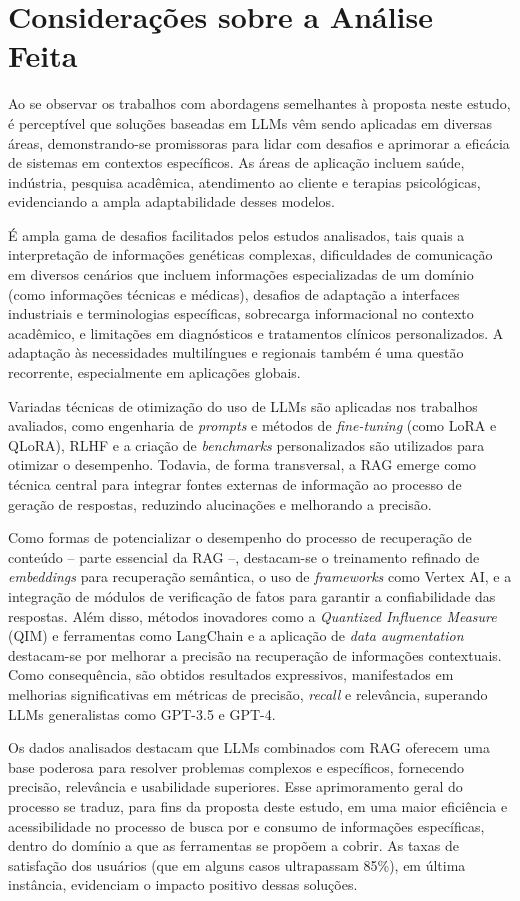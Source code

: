 \section{Considerações sobre a Análise Feita}
\label{sec:Literatura.2}

Ao se observar os trabalhos com abordagens semelhantes à proposta neste estudo, é perceptível que soluções baseadas em \ac{LLM}s vêm sendo aplicadas em diversas áreas, demonstrando-se promissoras para lidar com desafios e aprimorar a eficácia de sistemas em contextos específicos. As áreas de aplicação incluem saúde, indústria, pesquisa acadêmica, atendimento ao cliente e terapias psicológicas, evidenciando a ampla adaptabilidade desses modelos.

É ampla gama de desafios facilitados pelos estudos analisados, tais quais a interpretação de informações genéticas complexas, dificuldades de comunicação em diversos cenários que incluem informações especializadas de um domínio (como informações técnicas e médicas), desafios de adaptação a interfaces industriais e terminologias específicas, sobrecarga informacional no contexto acadêmico, e limitações em diagnósticos e tratamentos clínicos personalizados. A adaptação às necessidades multilíngues e regionais também é uma questão recorrente, especialmente em aplicações globais.

Variadas técnicas de otimização do uso de \ac{LLM}s são aplicadas nos trabalhos avaliados, como engenharia de \textit{prompts} e métodos de \textit{fine-tuning} (como LoRA e QLoRA), \ac{RLHF} e a criação de \textit{benchmarks} personalizados são utilizados para otimizar o desempenho. Todavia, de forma transversal, a RAG emerge como técnica central para integrar fontes externas de informação ao processo de geração de respostas, reduzindo alucinações e melhorando a precisão. 

Como formas de potencializar o desempenho do processo de recuperação de conteúdo -- parte essencial da \ac{RAG} --, destacam-se o treinamento refinado de \textit{embeddings} para recuperação semântica, o uso de \textit{frameworks} como Vertex AI, e a integração de módulos de verificação de fatos para garantir a confiabilidade das respostas. Além disso, métodos inovadores como a \textit{Quantized Influence Measure} (QIM) e ferramentas como LangChain e a aplicação de \textit{data augmentation} destacam-se por melhorar a precisão na recuperação de informações contextuais. Como consequência, são obtidos resultados expressivos, manifestados em melhorias significativas em métricas de precisão, \textit{recall} e relevância, superando \ac{LLM}s generalistas como GPT-3.5 e GPT-4.

Os dados analisados destacam que \ac{LLM}s combinados com \ac{RAG} oferecem uma base poderosa para resolver problemas complexos e específicos, fornecendo precisão, relevância e usabilidade superiores. Esse  aprimoramento geral do processo se traduz, para fins da proposta deste estudo, em uma maior eficiência e acessibilidade no processo de busca por e consumo de informações específicas, dentro do domínio a que as ferramentas se propõem a cobrir. As taxas de satisfação dos usuários (que em alguns casos ultrapassam 85\%), em última instância, evidenciam o impacto positivo dessas soluções.
